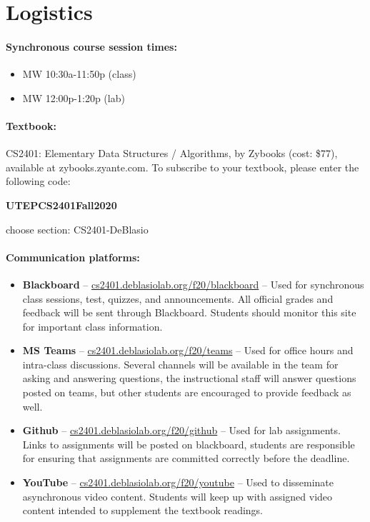 \documentclass[12pt]{scrartcl}
\newcommand{\change}[2]{#2}
\begin{document}
\clearpage
\tableofcontents

\section{Logistics}
\paragraph{Synchronous course session times:}
\begin{itemize}
\item MW 10:30a-11:50p (class)
\item MW 12:00p-1:20p (lab)
\end{itemize}

\paragraph{Textbook:} CS2401: Elementary Data Structures / Algorithms, by Zybooks (cost: \$77), available at zybooks.zyante.com. To subscribe to your textbook, please enter the following code: 
\begin{center}
\textbf{\Large UTEPCS2401Fall2020}
\end{center}
choose section: CS2401-DeBlasio 


\paragraph{Communication platforms:}
\change{}{\begin{itemize}
\item \textbf{Blackboard} -- \url{cs2401.deblasiolab.org/f20/blackboard}  -- Used for synchronous class sessions, test, quizzes, and announcements. All official grades and feedback will be sent through Blackboard. Students should monitor this site for important class information. 
\item \textbf{MS Teams} -- \url{cs2401.deblasiolab.org/f20/teams}  -- Used for office hours and intra-class discussions. Several channels will be available in the team for asking and answering questions, the instructional staff will answer questions posted on teams, but other students are encouraged to provide feedback as well. 
\item \textbf{Github} -- \url{cs2401.deblasiolab.org/f20/github}  -- Used for lab assignments. Links to assignments will be posted on blackboard, students are responsible for ensuring that assignments are committed correctly before the deadline. 
\item \textbf{YouTube} -- \url{cs2401.deblasiolab.org/f20/youtube} -- Used to disseminate asynchronous video content. Students will keep up with assigned video content intended to supplement the textbook readings.
\end{itemize}}
\end{document}
